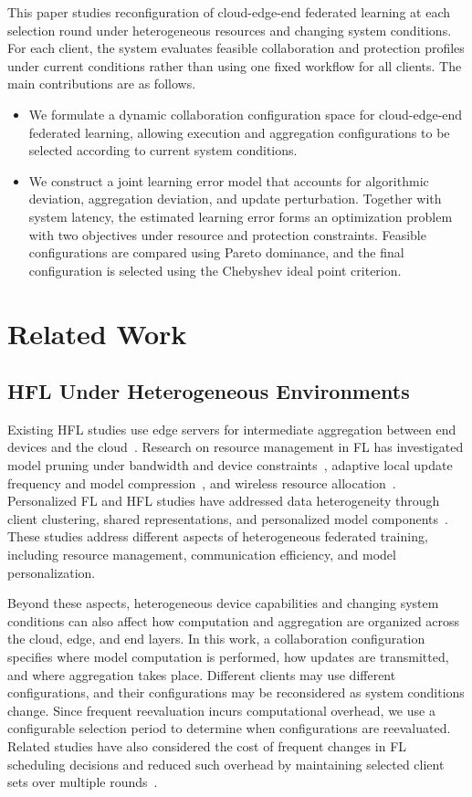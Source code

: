\documentclass[5p,times]{elsarticle}
\theoremstyle{plain}
\theoremstyle{definition}
\theoremstyle{remark}
\begin{document}
This paper studies reconfiguration of cloud-edge-end federated learning at each
selection round under heterogeneous resources and changing system conditions. For
each client, the system evaluates feasible collaboration and protection profiles
under current conditions rather than using one fixed workflow for all clients.
The main contributions are as follows.
\begin{itemize}
    \item We formulate a dynamic collaboration configuration space for cloud-edge-end federated learning, allowing execution and aggregation configurations to be selected according to current system conditions.

    \item We construct a joint learning error model that accounts for algorithmic deviation, aggregation deviation, and update perturbation. Together with system latency, the estimated learning error forms an optimization problem with two objectives under resource and protection constraints. Feasible configurations are compared using Pareto dominance, and the final configuration is selected using the Chebyshev ideal point criterion.
\end{itemize}

\section{Related Work}
\label{sec:related_work}
\subsection{HFL Under Heterogeneous Environments}
Existing HFL studies use edge servers for intermediate aggregation between end devices and the cloud~\cite{hfl}. Research on resource management in FL has investigated model pruning under bandwidth and device constraints~\cite{phfl}, adaptive local update frequency and model compression~\cite{xu2022adaptive,wang2019adaptivefl}, and wireless resource allocation~\cite{dinh2021wirelessfl}. Personalized FL and HFL studies have addressed data heterogeneity through client clustering, shared representations, and personalized model components~\cite{sattler2020clustered,collins2021exploiting,Personalizedhfl}. These studies address different aspects of heterogeneous federated training, including resource management, communication efficiency, and model personalization.

Beyond these aspects, heterogeneous device capabilities and changing system conditions can also affect how computation and aggregation are organized across the cloud, edge, and end layers. In this work, a collaboration configuration specifies where model computation is performed, how updates are transmitted, and where aggregation takes place. Different clients may use different configurations, and their configurations may be reconsidered as system conditions change. Since frequent reevaluation incurs computational overhead, we use a configurable selection period to determine when configurations are reevaluated. Related studies have also considered the cost of frequent changes in FL
scheduling decisions and reduced such overhead by maintaining selected client
sets over multiple rounds~\cite{CHEN2026112204,10757319}.
\end{document}
